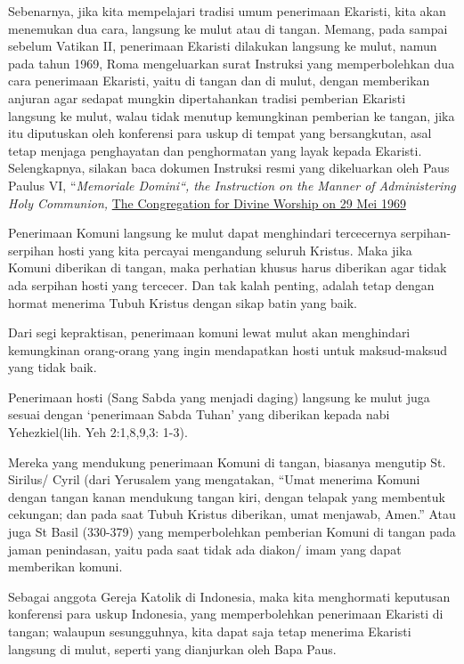 
Sebenarnya, jika kita mempelajari tradisi umum penerimaan Ekaristi, kita akan menemukan dua cara, langsung ke mulut atau di tangan. Memang, pada sampai sebelum Vatikan II, penerimaan Ekaristi dilakukan langsung ke mulut, namun pada tahun 1969, Roma mengeluarkan surat Instruksi yang memperbolehkan dua cara penerimaan Ekaristi, yaitu di tangan dan di mulut, dengan memberikan anjuran agar sedapat mungkin dipertahankan tradisi pemberian Ekaristi langsung ke mulut, walau tidak menutup kemungkinan pemberian ke tangan, jika itu diputuskan oleh konferensi para uskup di tempat yang bersangkutan, asal tetap menjaga penghayatan dan penghormatan yang layak kepada Ekaristi. Selengkapnya, silakan baca dokumen Instruksi resmi yang dikeluarkan oleh Paus Paulus VI, “\textit{Memoriale Domini“, the Instruction on the Manner of Administering Holy Communion, } \underline{The Congregation for Divine Worship on 29 Mei 1969}

Penerimaan Komuni langsung ke mulut dapat menghindari tercecernya serpihan-serpihan hosti yang kita percayai mengandung seluruh Kristus. Maka jika Komuni diberikan di tangan, maka perhatian khusus harus diberikan agar tidak ada serpihan hosti yang tercecer. Dan tak kalah penting, adalah tetap dengan hormat menerima Tubuh Kristus dengan sikap batin yang baik.

Dari segi kepraktisan, penerimaan komuni lewat mulut akan menghindari kemungkinan orang-orang yang ingin mendapatkan hosti untuk maksud-maksud yang tidak baik.

Penerimaan hosti (Sang Sabda yang menjadi daging) langsung ke mulut juga sesuai dengan ‘penerimaan Sabda Tuhan’ yang diberikan kepada nabi Yehezkiel(lih. Yeh 2:1,8,9,3: 1-3).

Mereka yang mendukung penerimaan Komuni di tangan, biasanya mengutip St. Sirilus/ Cyril (dari Yerusalem yang mengatakan, “Umat menerima Komuni dengan tangan kanan mendukung tangan kiri, dengan telapak yang membentuk cekungan; dan pada saat Tubuh Kristus diberikan, umat menjawab, Amen.” Atau juga St Basil (330-379) yang memperbolehkan pemberian Komuni di tangan pada jaman penindasan, yaitu pada saat tidak ada diakon/ imam yang dapat memberikan komuni.

Sebagai anggota Gereja Katolik di Indonesia, maka kita menghormati keputusan konferensi para uskup Indonesia, yang memperbolehkan penerimaan Ekaristi di tangan; walaupun sesungguhnya, kita dapat saja tetap menerima Ekaristi langsung di mulut, seperti yang dianjurkan oleh Bapa Paus. 

